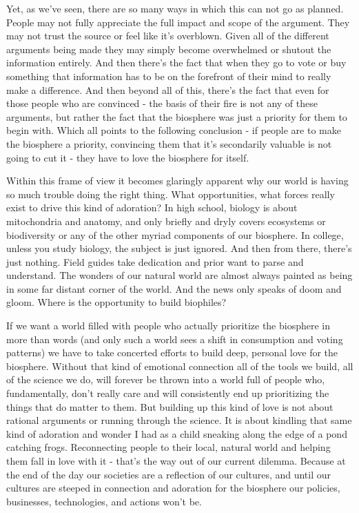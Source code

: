 \documentclass[10pt,a5paper]{book}
\begin{document}
Yet, as we've seen, there are so many ways in which this can not go as planned. People may not fully appreciate the full impact and scope of the argument. They may not trust the source or feel like it's overblown. Given all of the different arguments being made they may simply become overwhelmed or shutout the information entirely. And then there's the fact that when they go to vote or buy something that information has to be on the forefront of their mind to really make a difference. And then beyond all of this, there's the fact that even for those people who are convinced - the basis of their fire is not any of these arguments, but rather the fact that the biosphere was just a priority for them to begin with. Which all points to the following conclusion - if people are to make the biosphere a priority, convincing them that it's secondarily valuable is not going to cut it - they have to love the biosphere for itself. 

Within this frame of view it becomes glaringly apparent why our world is having so much trouble doing the right thing. What opportunities, what forces really exist to drive this kind of adoration? In high school, biology is about mitochondria and anatomy, and only briefly and dryly covers ecosystems or biodiversity or any of the other myriad components of our biosphere. In college, unless you study biology, the subject is just ignored. And then from there, there's just nothing. Field guides take dedication and prior want to parse and understand. The wonders of our natural world are almost always painted as being in some far distant corner of the world. And the news only speaks of doom and gloom. Where is the opportunity to build biophiles? 

If we want a world filled with people who actually prioritize the biosphere in more than words (and only such a world sees a shift in consumption and voting patterns) we have to take concerted efforts to build deep, personal love for the biosphere. Without that kind of emotional connection all of the tools we build, all of the science we do, will forever be thrown into a world full of people who, fundamentally, don't really care and will consistently end up prioritizing the things that do matter to them. But building up this kind of love is not about rational arguments or running through the science. It is about kindling that same kind of adoration and wonder I had as a child sneaking along the edge of a pond catching frogs. Reconnecting people to their local, natural world and helping them fall in love with it - that's the way out of our current dilemma. Because at the end of the day our societies are a reflection of our cultures, and until our cultures are steeped in connection and adoration for the biosphere our policies, businesses, technologies, and actions won't be.
\end{document}
